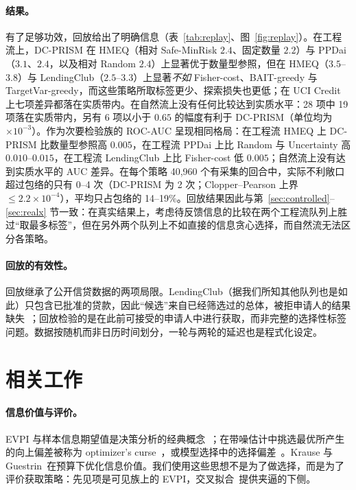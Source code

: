 \documentclass[runningheads]{llncs}
\begin{document}
\paragraph{结果。}有了足够功效，回放给出了明确信息（表~\ref{tab:replay}、图~\ref{fig:replay}）。在工程流上，DC-PRISM 在 HMEQ（相对 Safe-MinRisk $2.4$、固定数量 $2.2$）与 PPDai（$3.1$、$2.4$，以及相对 Random $2.4$）上显著优于数量型参照，但在 HMEQ（$3.5$--$3.8$）与 LendingClub（$2.5$--$3.3$）上显著\emph{不如} Fisher-cost、BAIT-greedy 与 TargetVar-greedy，而这些策略所取标签更少、探索损失也更低；在 UCI Credit 上七项差异都落在实质带内。在自然流上没有任何比较达到实质水平：28 项中 19 项落在实质带内，另有 6 项以小于 $0.65$ 的幅度有利于 DC-PRISM（单位均为 $\times10^{-3}$）。作为次要检验族的 ROC-AUC 呈现相同格局：在工程流 HMEQ 上 DC-PRISM 比数量型参照高 $0.005$，在工程流 PPDai 上比 Random 与 Uncertainty 高 $0.010$--$0.015$，在工程流 LendingClub 上比 Fisher-cost 低 $0.005$；自然流上没有达到实质水平的 AUC 差异。在每个策略 40{,}960 个有采集的回合中，实际不利敞口超过包络的只有 0--4 次（DC-PRISM 为 2 次；Clopper--Pearson 上界 $\le2.2\times10^{-4}$），平均只占包络的 14--19\%。回放结果因此与第~\ref{sec:controlled}--\ref{sec:realx} 节一致：在真实结果上，考虑待反馈信息的比较在两个工程流队列上胜过“取最多标签”，但在另外两个队列上不如直接的信息贪心选择，而自然流无法区分各策略。

\paragraph{回放的有效性。}回放继承了公开信贷数据的两项局限。LendingClub（据我们所知其他队列也是如此）只包含已批准的贷款，因此“候选”来自已经筛选过的总体，被拒申请人的结果缺失~\cite{crook2004reject}；回放检验的是在此前可接受的申请人中进行获取，而非完整的选择性标签问题。数据按随机而非日历时间划分，一轮与两轮的延迟也是程式化设定。

\section{相关工作}
\label{sec:related}
\paragraph{信息价值与评价。}EVPI 与样本信息期望值是决策分析的经典概念~\cite{howard1966information,raiffa1961applied}；在带噪估计中挑选最优所产生的向上偏差被称为 optimizer's curse~\cite{smith2006optimizer}，或模型选择中的选择偏差~\cite{cawley2010overfitting}。Krause 与 Guestrin~\cite{krause2005near}在预算下优化信息价值。我们使用这些思想不是为了做选择，而是为了评价获取策略：先见项是可见族上的 EVPI，交叉拟合~\cite{chernozhukov2018double}提供夹逼的下侧。
\end{document}
